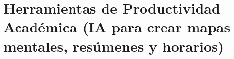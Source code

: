 
\section[Herramientas de Productividad Académica]{Herramientas de Productividad Académica (IA para crear mapas mentales, resúmenes y horarios)}


